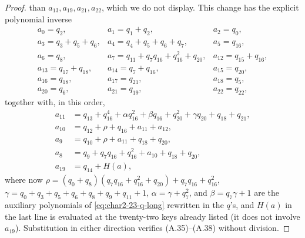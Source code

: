 \begin{proof}
than $a_{13},a_{19},a_{21},a_{22}$, which we do not display.
This change has the explicit polynomial inverse
\[
\begin{array}{lll}
a_0=q_2,&a_1=q_1+q_2,&a_2=q_0,\\
a_3=q_3+q_5+q_6,&a_4=q_4+q_5+q_6+q_7,&a_5=q_{16},\\
a_6=q_8,&a_7=q_{11}+q_7q_{16}+q_{16}^2+q_{20},&a_{12}=q_{15}+q_{16},\\
a_{13}=q_{17}+q_{18},&a_{14}=q_7+q_{16},&a_{15}=q_{20},\\
a_{16}=q_{18},&a_{17}=q_{21},&a_{18}=q_5,\\
a_{20}=q_6,&a_{21}=q_{19},&a_{22}=q_{22},
\end{array}                                                       \tag{A.37}\label{eq:char2-23-q-inverse}
\]
together with, in this order,
\[
\begin{aligned}
a_{11}&=q_{13}+q_{16}^4+\alpha q_{16}^2+\beta q_{16}+q_{20}^2+\gamma q_{20}
        +q_{18}+q_{21},\\
a_{10}&=q_{12}+\rho+q_{16}+a_{11}+a_{12},\\
a_9&=q_{10}+\rho+a_{11}+q_{18}+q_{20},\\
a_8&=q_9+q_7q_{16}+q_{16}^2+a_{10}+q_{18}+q_{20},\\
a_{19}&=q_{14}+H(a),
\end{aligned}                                                     \tag{A.38}\label{eq:char2-23-q-inverse-long}
\]
where now $\rho=(q_0+q_8)(q_7q_{16}+q_{16}^2+q_{20})+q_7q_{16}+q_{16}^2$,
$\gamma=q_0+q_3+q_5+q_6+q_8+q_9+q_{11}+1$, $\alpha=\gamma+q_7^2$, and
$\beta=q_7\gamma+1$ are the auxiliary polynomials of \eqref{eq:char2-23-q-long}
rewritten in the $q$'s, and $H(a)$ in the last line is evaluated at the
twenty-two keys already listed (it does not involve $a_{19}$).
Substitution in either direction verifies (A.35)--(A.38) without division.


\end{proof}
